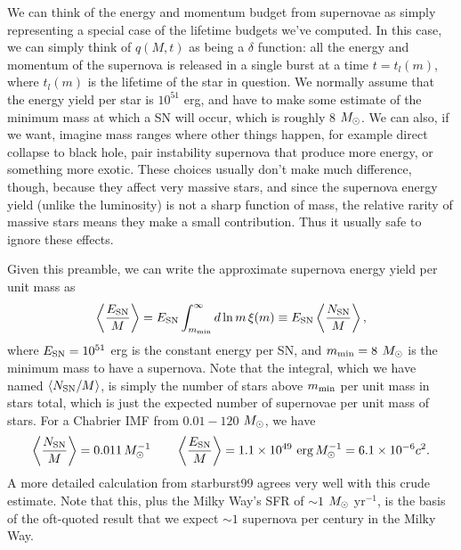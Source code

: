 We can think of the energy and momentum budget from supernovae as simply representing a special case of the lifetime budgets we've computed. In this case, we can simply think of $q(M,t)$ as being a $\delta$ function: all the energy and momentum of the supernova is released in a single burst at a time $t=t_l(m)$, where $t_l(m)$ is the lifetime of the star in question. We normally assume that the energy yield per star is $10^{51}$ erg, and have to make some estimate of the minimum mass at which a SN will occur, which is roughly 8 $M_{\odot}$. We can also, if we want, imagine mass ranges where other things happen, for example direct collapse to black hole, pair instability supernova that produce more energy, or something more exotic. These choices usually don't make much difference, though, because they affect very massive stars, and since the supernova energy yield (unlike the luminosity) is not a sharp function of mass, the relative rarity of massive stars means they make a small contribution. Thus it usually safe to ignore these effects.

Given this preamble, we can write the approximate supernova energy yield per unit mass as
\begin{equation}
\left\langle \frac{E_{\rm SN}}{M}\right\rangle = E_{\rm SN} \int_{m_{\rm min}}^\infty d\ln m\, \xi(m) \equiv E_{\rm SN} \left\langle \frac{N_{\rm SN}}{M}\right\rangle,
\end{equation}
where $E_{\rm SN} = 10^{51}$ erg is the constant energy per SN, and $m_{\rm min} = 8$ $M_{\odot}$ is the minimum mass to have a supernova. Note that the integral, which we have named $\langle N_{\rm SN}/M\rangle$, is simply the number of stars above $m_{\rm min}$ per unit mass in stars total, which is just the expected number of supernovae per unit mass of stars. For a Chabrier IMF from $0.01-120$ $M_{\odot}$, we have
\begin{equation}
\left\langle \frac{N_{\rm SN}}{M}\right\rangle = 0.011\, M_{\odot}^{-1}
\qquad
\left\langle \frac{E_{\rm SN}}{M}\right\rangle = 1.1\times 10^{49}\mbox{ erg}\,M_{\odot}^{-1}=6.1\times 10^{-6} c^2.
\end{equation}
A more detailed calculation from starburst99 agrees very well with this crude estimate. Note that this, plus the Milky Way's SFR of $\sim 1$ $M_{\odot}$ yr$^{-1}$, is the basis of the oft-quoted result that we expect $\sim 1$ supernova per century in the Milky Way.

